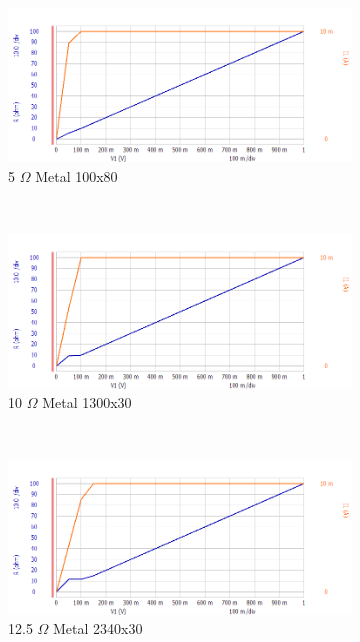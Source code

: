 \documentclass[letter,12pt]{article}
\begin{document}
\begin{figure}[h!]
				~
				\begin{subfigure}[b]{.45\textwidth}
					\includegraphics[width=\textwidth]{./Images/Probe_Test/R_Metal_100x80.png}
					\caption{5 $\Omega$ Metal 100x80}
				\end{subfigure}
				~
				\begin{subfigure}[b]{.45\textwidth}
					\includegraphics[width=\textwidth]{./Images/Probe_Test/R_Metal_1300x30.png}
					\caption{10 $\Omega$ Metal 1300x30}
				\end{subfigure}
				~
				\begin{subfigure}[b]{.45\textwidth}
					\includegraphics[width=\textwidth]{./Images/Probe_Test/R_Metal_2340x30.png}
					\caption{12.5 $\Omega$ Metal 2340x30}
				\end{subfigure}
				~
				\begin{subfigure}[b]{.45\textwidth}

\end{subfigure}
\end{figure}
\end{document}
